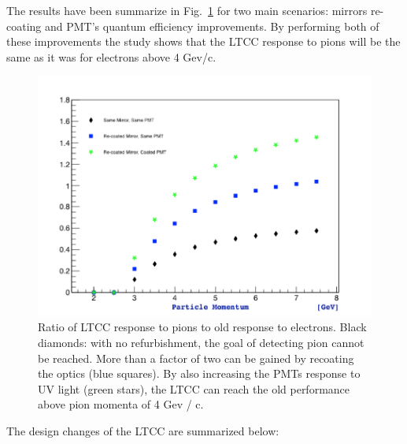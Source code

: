 The results have been summarize in Fig.~\ref{fig:refurbishmentGains} for two main scenarios: mirrors re-coating and PMT's quantum efficiency improvements.
By performing both of these improvements the study shows that the LTCC response to pions will be the same as it was for electrons above 4 Gev/c.

\begin{figure}[hbt]
	\centering
	\includegraphics[width=1.0\columnwidth,keepaspectratio]{img/refurbishmentGains.png}
\caption{Ratio of LTCC response to pions to old response to electrons. Black diamonds: with no refurbishment, the goal of detecting pion cannot be reached.
          More than a factor of two can be gained by recoating the optics (blue squares). By also increasing the PMTs response to UV light (green stars), the
          LTCC can reach the old performance above pion momenta of 4 Gev / c.}
	\label{fig:refurbishmentGains}
\end{figure}


The design changes of the LTCC are summarized below:

